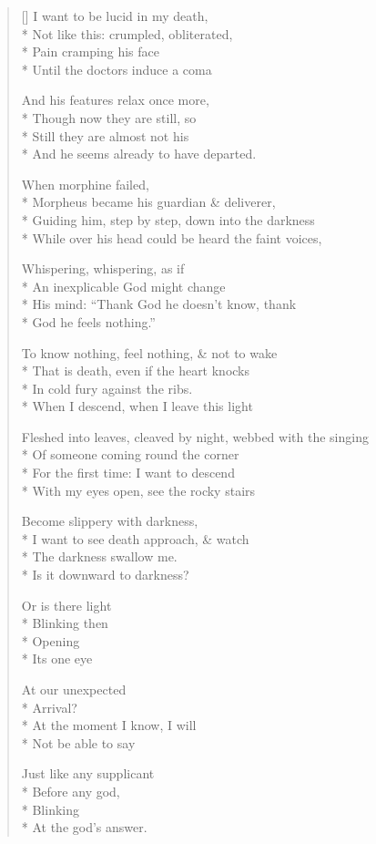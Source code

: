 \label{ch:deliverance}
\settowidth{\versewidth}{Fleshed into leaves, cleaved by night, webbed with the singing}
\begin{verse}[\versewidth]
I want to be lucid in my death,\\*
Not like this: crumpled, obliterated,\\*
Pain cramping his face\\*
Until the doctors induce a coma

And his features relax once more,\\*
Though now they are still, so\\*
Still they are almost not his\\*
And he seems already to have departed.

\hspace{4\vgap} When morphine failed,\\*
Morpheus became his guardian \& deliverer,\\*
Guiding him, step by step, down into the darkness\\*
While over his head could be heard the faint voices,

Whispering, whispering, as if\\*
An inexplicable God might change\\*
His mind: ``Thank God he doesn't know, thank\\*
God he feels nothing.''

To know nothing, feel nothing, \& not to wake\\*
That is death, even if the heart knocks\\*
In cold fury against the ribs.\\*
When I descend, when I leave this light

Fleshed into leaves, cleaved by night, webbed with the singing\\*
Of someone coming round the corner \\*
For the first time: I want to descend\\*
With my eyes open, see the rocky stairs

Become slippery with darkness,\\*
I want to see death approach, \& watch\\*
The darkness swallow me.\\*
Is it downward to darkness?

Or is there light\\*
Blinking then\\*
Opening\\*
Its one eye


At our unexpected\\*
Arrival?\\*
At the moment I know, I will\\*
Not be able to say

Just like any supplicant\\*
Before any god,\\*
Blinking\\*
At the god's answer.
\end{verse}
